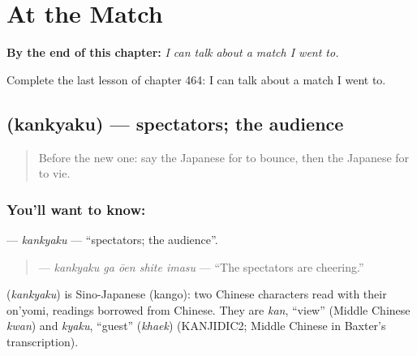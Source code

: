 
\chapter{At the Match}
\label{ch:ja-at-the-match}

\begin{chapteropening}
\textbf{By the end of this chapter:} \emph{I can talk about a match I went to.}

Complete the last lesson of chapter 464: I can talk about a match I went to.
\end{chapteropening}

\section[\texorpdfstring{\ja{かんきゃく} (kankyaku)}{かんきゃく (kankyaku)}]{ (kankyaku) — spectators; the audience}

\label{lesson:JA-C464-kankyaku}



\begin{quote}
Before the new one: say the Japanese for to bounce, then the Japanese for to vie.
\end{quote}

\subsection*{You'll want to know: }
\textbf{} — \emph{kankyaku} — \textquotedblleft{}spectators; the audience\textquotedblright{}.

\begin{quote}
\textbf{ } — \emph{kankyaku ga ōen shite imasu} — \textquotedblleft{}The spectators are cheering.\textquotedblright{}
\end{quote}

\begin{cousinweb}
\textbf{} (\emph{kankyaku}) is Sino-Japanese (kango): two Chinese characters read with their on'yomi, readings borrowed from Chinese. They are \emph{kan}, \textquotedblleft{}view\textquotedblright{} (Middle Chinese \emph{kwan}) and \emph{kyaku}, \textquotedblleft{}guest\textquotedblright{} (\emph{khaek}) (KANJIDIC2; Middle Chinese in Baxter's transcription).
\end{cousinweb}


